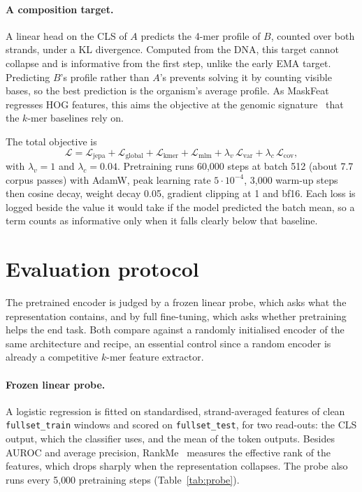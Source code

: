 \documentclass[10pt,twocolumn,a4paper]{article}
\begin{document}
\paragraph{A composition target.}
A linear head on the CLS of $A$ predicts the 4-mer profile of $B$, counted over
both strands, under a KL divergence. Computed from the DNA, this target cannot
collapse and is informative from the first step, unlike the early EMA target.
Predicting $B$'s profile rather than $A$'s prevents solving it by counting
visible bases, so the best prediction is the organism's average profile. As
MaskFeat~\cite{wei2022maskfeat} regresses HOG features, this aims the objective
at the genomic signature~\cite{karlin1995signature} that the $k$-mer baselines
rely on.

The total objective is
\begin{equation}
\mathcal{L}=\mathcal{L}_{\text{jepa}}+\mathcal{L}_{\text{global}}
           +\mathcal{L}_{\text{kmer}}+\mathcal{L}_{\text{mlm}}
           +\lambda_{v}\,\mathcal{L}_{\text{var}}+\lambda_{c}\,\mathcal{L}_{\text{cov}},
\end{equation}
with $\lambda_v=1$ and $\lambda_c=0.04$. Pretraining runs 60{,}000 steps at batch
512 (about 7.7 corpus passes) with AdamW, peak learning rate $5\cdot10^{-4}$,
3{,}000 warm-up steps then cosine decay, weight decay 0.05, gradient clipping at
1 and bf16. Each loss is logged beside the value it would take if the model
predicted the batch mean, so a term counts as informative only when it falls
clearly below that baseline.

\section{Evaluation protocol}\label{sec:eval}

The pretrained encoder is judged by a frozen linear probe, which asks what the
representation contains, and by full fine-tuning, which asks whether pretraining
helps the end task. Both compare against a randomly initialised encoder of the
same architecture and recipe, an essential control since a random encoder is
already a competitive $k$-mer feature extractor.

\paragraph{Frozen linear probe.}
A logistic regression is fitted on standardised, strand-averaged features of
clean \texttt{fullset\_train} windows and scored on \texttt{fullset\_test}, for
two read-outs: the CLS output, which the classifier uses, and the mean of the
token outputs. Besides AUROC and average precision, RankMe~\cite{garrido2023rankme}
measures the effective rank of the features, which drops sharply when the
representation collapses. The probe also runs every 5{,}000 pretraining steps
(Table~\ref{tab:probe}).
\end{document}
